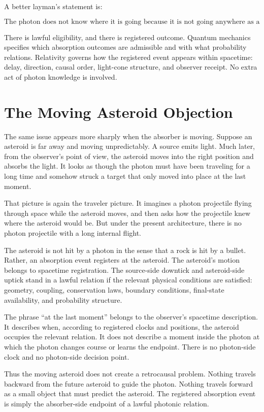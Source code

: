 \documentclass[12pt,onecolumn]{article}
\begin{document}
A better layman's statement is:

\[
\text{The photon does not know where it is going because it is not going anywhere as a traveler.}
\]

There is lawful eligibility, and there is registered outcome. Quantum mechanics specifies which absorption outcomes are admissible and with what probability relations. Relativity governs how the registered event appears within spacetime: delay, direction, causal order, light-cone structure, and observer receipt. No extra act of photon knowledge is involved.

\section{The Moving Asteroid Objection}

The same issue appears more sharply when the absorber is moving. Suppose an asteroid is far away and moving unpredictably. A source emits light. Much later, from the observer's point of view, the asteroid moves into the right position and absorbs the light. It looks as though the photon must have been traveling for a long time and somehow struck a target that only moved into place at the last moment.

That picture is again the traveler picture. It imagines a photon projectile flying through space while the asteroid moves, and then asks how the projectile knew where the asteroid would be. But under the present architecture, there is no photon projectile with a long internal flight.

The asteroid is not hit by a photon in the sense that a rock is hit by a bullet. Rather, an absorption event registers at the asteroid. The asteroid's motion belongs to spacetime registration. The source-side downtick and asteroid-side uptick stand in a lawful relation if the relevant physical conditions are satisfied: geometry, coupling, conservation laws, boundary conditions, final-state availability, and probability structure.

The phrase ``at the last moment'' belongs to the observer's spacetime description. It describes when, according to registered clocks and positions, the asteroid occupies the relevant relation. It does not describe a moment inside the photon at which the photon changes course or learns the endpoint. There is no photon-side clock and no photon-side decision point.

Thus the moving asteroid does not create a retrocausal problem. Nothing travels backward from the future asteroid to guide the photon. Nothing travels forward as a small object that must predict the asteroid. The registered absorption event is simply the absorber-side endpoint of a lawful photonic relation.
\end{document}
